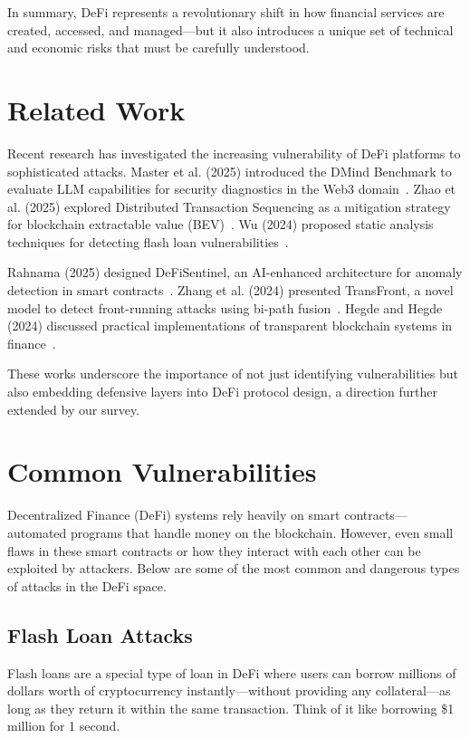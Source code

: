 \documentclass[conference]{IEEEtran}
\begin{document}
In summary, DeFi represents a revolutionary shift in how financial services are created, accessed, and managed—but it also introduces a unique set of technical and economic risks that must be carefully understood.



\section{Related Work}
Recent research has investigated the increasing vulnerability of DeFi platforms to sophisticated attacks. Master et al. (2025) introduced the DMind Benchmark to evaluate LLM capabilities for security diagnostics in the Web3 domain~\cite{master2025dmind}. Zhao et al. (2025) explored Distributed Transaction Sequencing as a mitigation strategy for blockchain extractable value (BEV)~\cite{zhao2025mitigating}. Wu (2024) proposed static analysis techniques for detecting flash loan vulnerabilities~\cite{wu2024static}.

Rahnama (2025) designed DeFiSentinel, an AI-enhanced architecture for anomaly detection in smart contracts~\cite{rahnama2025defisentinel}. Zhang et al. (2024) presented TransFront, a novel model to detect front-running attacks using bi-path fusion~\cite{zhang2024transfront}. Hegde and Hegde (2024) discussed practical implementations of transparent blockchain systems in finance~\cite{hegde2024efficient}.

These works underscore the importance of not just identifying vulnerabilities but also embedding defensive layers into DeFi protocol design, a direction further extended by our survey.

\section{Common Vulnerabilities}

Decentralized Finance (DeFi) systems rely heavily on smart contracts—automated programs that handle money on the blockchain. However, even small flaws in these smart contracts or how they interact with each other can be exploited by attackers. Below are some of the most common and dangerous types of attacks in the DeFi space.

\subsection{Flash Loan Attacks}

Flash loans are a special type of loan in DeFi where users can borrow millions of dollars worth of cryptocurrency instantly—without providing any collateral—as long as they return it within the same transaction. Think of it like borrowing \$1 million for 1 second.
\end{document}
